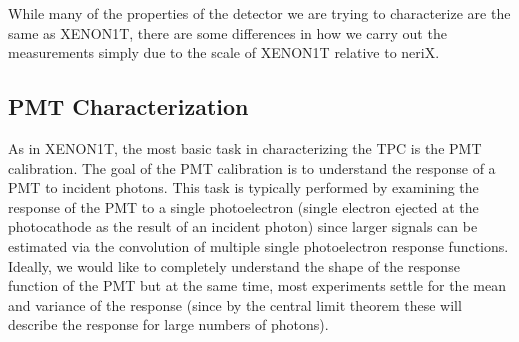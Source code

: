 While many of the properties of the detector we are trying to characterize are the same as XENON1T, there are some differences in how we carry out the measurements simply due to the scale of XENON1T relative to neriX.



\subsection{PMT Characterization}

As in XENON1T, the most basic task in characterizing the TPC is the PMT calibration.  The goal of the PMT calibration is to understand the response of a PMT to incident photons.  This task is typically performed by examining the response of the PMT to a single photoelectron (single electron ejected at the photocathode as the result of an incident photon) since larger signals can be estimated via the convolution of multiple single photoelectron response functions.  Ideally, we would like to completely understand the shape of the response function of the PMT but at the same time, most experiments settle for the mean and variance of the response (since by the central limit theorem these will describe the response for large numbers of photons).  %


